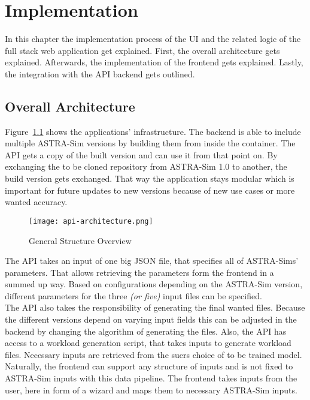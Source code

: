 
\chapter{Implementation} %
\label{chap:implementation}

In this chapter the implementation process of the \ac{UI} and the related logic of the full stack web application get explained. 
First, the overall architecture gets explained. Afterwards, the implementation of the frontend gets explained. Lastly, the integration with the \ac{API} backend gets outlined. 


\section{Overall Architecture}
Figure~\ref{fig:architecture} shows the applications' infrastructure. 
The backend is able to include multiple \ac{ASTRA-Sim} versions by building them from inside the container. The \ac{API} gets a copy of the built version and can use it from that point on. By exchanging the to be cloned repository from \ac{ASTRA-Sim} 1.0 to another, the build version gets exchanged. That way the application stays modular which is important for future updates to new versions because of new use cases or more wanted accuracy. 

\begin{figure}[H]
    \centering
    \texttt{[image: api-architecture.png]}
    \caption{General Structure Overview}
    \label{fig:architecture}
\end{figure}

The \ac{API} takes an input of one big \ac{JSON} file, that specifies all of \acp{ASTRA-Sim}' parameters. That allows retrieving the parameters form the frontend in a summed up way. Based on configurations depending on the \ac{ASTRA-Sim} version, different parameters for the three \textit{(or five)} input files can be specified. \\
The \ac{API} also takes the responsibility of generating the final wanted files. Because the different versions depend on varying input fields this can be adjusted in the backend by changing the algorithm of generating the files.
Also, the \ac{API} has access to a workload generation script, that takes inputs to generate workload files. Necessary inputs are retrieved from the suers choice of to be trained model. \\
Naturally, the frontend can support any structure of inputs and is not fixed to \ac{ASTRA-Sim} inputs with this data pipeline.
The frontend takes inputs from the user, here in form of a wizard and maps them to necessary \ac{ASTRA-Sim} inputs.



